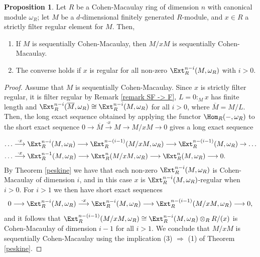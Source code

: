 \documentclass[12pt]{amsart}
\theoremstyle{definition}
\newtheorem{proposition}[theorem]{Proposition}
\theoremstyle{definition}
\let\lra\longrightarrow
\begin{document}
\begin{proposition} \label{hscor1.9}
  Let $R$ be a Cohen-Macaulay ring of dimension $n$ with canonical module $\omega_R$; let $M$ be a $d$-dimensional finitely generated $R$-module, and $x \in R$ a strictly filter regular element for $M$. Then,
  \begin{enumerate}[(1)]
  \item  If $M$ is sequentially Cohen-Macaulay, then $M/xM$ is sequentially Cohen-Macaulay.
  \item The converse holds if $x$ is regular for all non-zero $\Ext^{n-i}_R(M,\omega_R)$ with $i>0$.
  \end{enumerate}
\end{proposition}
\begin{proof}
Assume that $M$ is sequentially Cohen-Macaulay.       Since $x$ is strictly filter regular, it is filter regular by Remark \ref{remark SF -> F},  $L=0:_M x$ has finite length and $\Ext^{n-i}_R(\overline{M},\omega_R) \cong \Ext^{n-i}_R(M,\omega_R)$ for all $i>0$, where $\overline{M}=M/L$.  Then, the long exact sequence obtained by applying the functor $\Hom_R(-,\omega_R)$ to the short exact sequence $0 \lra \overline{M} \stackrel{\cdot x}{\lra} M \lra M/xM \lra 0$ gives  a long exact sequence 

\begin{equation*}
  \begin{split}
\ldots& \stackrel{\cdot x}\lra \Ext^{n-i}_R(M,\omega_R) \lra \Ext^{n-(i-1)}_R(M/xM,\omega_R) \lra \Ext^{n-(i-1)}_R(M,\omega_R) \to \ldots \\
\ldots& \stackrel{\cdot x}{\lra}  \Ext^{n-1}_R(M,\omega_R) \lra  \Ext^n_R(M/xM,\omega_R) \lra \Ext^n_R(M,\omega_R) \lra 0.    
  \end{split}
\end{equation*}
By Theorem \ref{peskine} we have that      each non-zero $\Ext^{n-i}_R(M,\omega_R)$ is Cohen-Macaulay of dimension $i$, and in this case $x$ is $\Ext^{n-i}_R(M,\omega_R)$-regular when $i>0$.  For $i>1$ we then have short exact sequences 
\[
0 \lra \Ext^{n-i}_R(M,\omega_R) \stackrel{\cdot x}{\lra} \Ext^{n-i}_R(M,\omega_R) \lra \Ext^{n-(i-1)}_R(M/xM,\omega_R) \lra 0,
\]
and it follows that $\Ext^{n-(i-1)}_R(M/xM,\omega_R) \cong \Ext^{n-i}_R(M,\omega_R) \otimes_R R/(x)$ is Cohen-Macaulay of dimension $i-1$ for all $i>1$. We conclude that $M/xM$ is sequentially Cohen-Macaulay using the implication (3) $\Rightarrow$ (1) of Theorem \ref{peskine}.


\end{proof}
\end{document}
